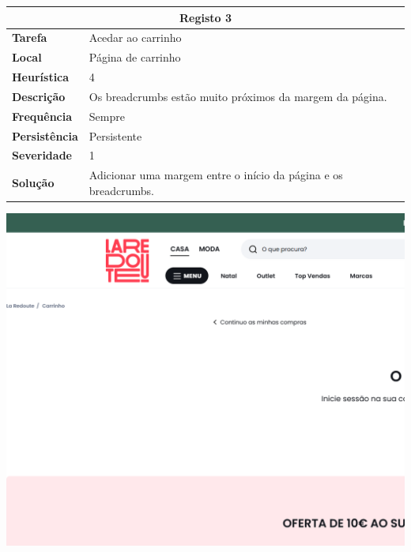 \documentclass[a4paper,12pt]{article}
\begin{document}
\begin{center}
\newpage
    \begin{table}[h!]
        \centering
        \begin{tabular}{|m{3cm}|m{12cm}|}
        \hline
        \multicolumn{2}{|c|}{\textbf{Registo 3}} \\ \hline
        \textbf{Tarefa}       & Acedar ao carrinho \\ \hline
        \textbf{Local}        & Página de carrinho \\ \hline
        \textbf{Heurística}   & 4  \\ \hline
        \textbf{Descrição}    & Os breadcrumbs estão muito próximos da margem da página. \\ \hline
        \textbf{Frequência}   & Sempre \\ \hline
        \textbf{Persistência} & Persistente \\ \hline
        \textbf{Severidade}   & 1 \\ \hline
        \textbf{Solução}      & Adicionar uma margem entre o início da página e os breadcrumbs. \\ \hline
        \end{tabular}
    \end{table}
    
    \vspace{0.5cm}
    \includegraphics[width=\textwidth, keepaspectratio]{heuristics/03breadcrumbs_carrinho.png}


\end{center}
\end{document}

